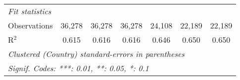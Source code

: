 \begin{tabular}{lcccccc}
   \midrule \emph{Fit statistics}\\
   Observations                                                                                       & 36,278  & 36,278         & 36,278         & 24,108         & 22,189         & 22,189\\  
   R$^2$                                                                                              & 0.615   & 0.616          & 0.616          & 0.646          & 0.650          & 0.650\\  
   \midrule
   \multicolumn{7}{l}{\emph{Clustered (Country) standard-errors in parentheses}}\\
   \multicolumn{7}{l}{\emph{Signif. Codes: ***: 0.01, **: 0.05, *: 0.1}}\\
\end{tabular}
\par\endgroup


